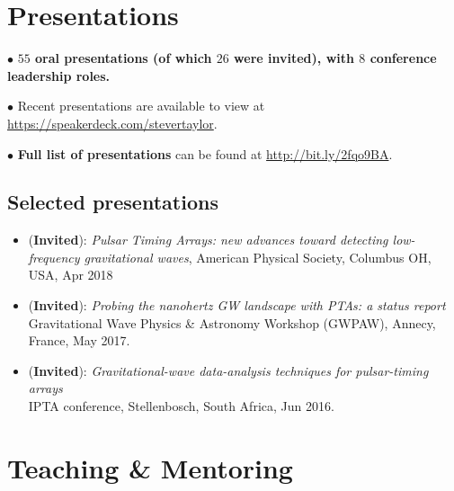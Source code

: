 \documentclass[11pt,letterpaper,sans]{moderncv}
\begin{document}
\section{Presentations}

$\bullet$ \textbf{$55$ oral presentations (of which $26$ were invited), with $8$ conference leadership roles.}

$\bullet$ Recent presentations are available to view at {\color{color1} \href{https://speakerdeck.com/stevertaylor}{https://speakerdeck.com/stevertaylor}}.

$\bullet$ \textbf{Full list of presentations} can be found at {\color{color1} \href{http://bit.ly/2fqo9BA}{http://bit.ly/2fqo9BA}}.

\subsection{Selected presentations}

\begin{itemize}[leftmargin=8mm]

\item (\textbf{Invited}): \textit{Pulsar Timing Arrays: new advances toward detecting low-frequency gravitational waves}, American Physical Society, Columbus OH, USA, Apr 2018

\item (\textbf{Invited}): \textit{Probing the nanohertz GW landscape with PTAs: a status report} \\ Gravitational Wave Physics \& Astronomy Workshop (GWPAW), Annecy, France, May 2017.

\item (\textbf{Invited}): \textit{Gravitational-wave data-analysis techniques for pulsar-timing arrays} \\ IPTA conference, Stellenbosch, South Africa, Jun 2016.

\end{itemize}

\section{Teaching \& Mentoring}

\end{document}
